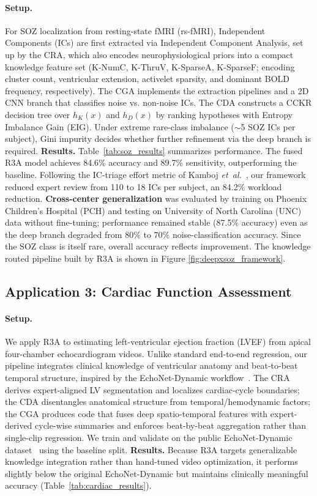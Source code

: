 \documentclass{article}
\newcommand{\etal}{\textit{et~al.}}
\begin{document}
\paragraph{Setup.}
For SOZ localization from resting-state fMRI (rs-fMRI), Independent Components (ICs) are first
extracted via Independent Component Analysis, set up by the CRA, which
also encodes neurophysiological priors into a compact knowledge feature
set (K-NumC, K-ThruV, K-SparseA, K-SparseF; encoding cluster count, ventricular extension, activelet sparsity, and dominant BOLD frequency, respectively). The CGA implements the
extraction pipelines and a 2D CNN branch that classifies noise vs.
non-noise ICs. The CDA constructs a CCKR decision tree over $h_K(x)$ and
$h_D(x)$ by ranking hypotheses with Entropy Imbalance Gain (EIG). Under
extreme rare-class imbalance ($\sim$5 SOZ ICs per subject), Gini impurity
decides whether further refinement via the deep branch is required. \textbf{Results.}
Table~\ref{tab:soz_results} summarizes performance. The fused R3A model
achieves 84.6\% accuracy and 89.7\% sensitivity, outperforming the
baseline. Following the IC-triage effort metric of Kamboj
\etal~\cite{kamboj2024expertTAI}, our framework reduced expert review from
110 to 18 ICs per subject, an 84.2\% workload reduction.
\textbf{Cross-center generalization} was evaluated by training on Phoenix
Children's Hospital (PCH) and testing on University of North Carolina
(UNC) data without fine-tuning; performance remained stable (87.5\%
accuracy) even as the deep branch degraded from 80\% to 70\% noise-classification
accuracy. Since the SOZ class is itself rare, overall accuracy reflects
improvement. The knowledge routed pipeline built by R3A is shown in Figure \ref{fig:deepxsoz_framework}.


\subsection{Application 3: Cardiac Function Assessment}

\paragraph{Setup.}
We apply R3A to estimating left-ventricular ejection fraction (LVEF) from
apical four-chamber echocardiogram videos. Unlike standard end-to-end
regression, our pipeline integrates clinical knowledge of ventricular
anatomy and beat-to-beat temporal structure, inspired by the EchoNet-Dynamic
workflow~\cite{ouyang2020echodynamic}. The CRA derives expert-aligned LV
segmentation and localizes cardiac-cycle boundaries; the CDA disentangles
anatomical structure from temporal/hemodynamic factors; the CGA produces
code that fuses deep spatio-temporal features with expert-derived
cycle-wise summaries and enforces beat-by-beat aggregation rather than
single-clip regression. We train and validate on the public EchoNet-Dynamic
dataset~\cite{echonetdataset} using the baseline split. \textbf{Results.}
Because R3A targets generalizable knowledge integration rather than
hand-tuned video optimization, it performs slightly below the original
EchoNet-Dynamic but maintains clinically meaningful accuracy
(Table~\ref{tab:cardiac_results}).
\end{document}
